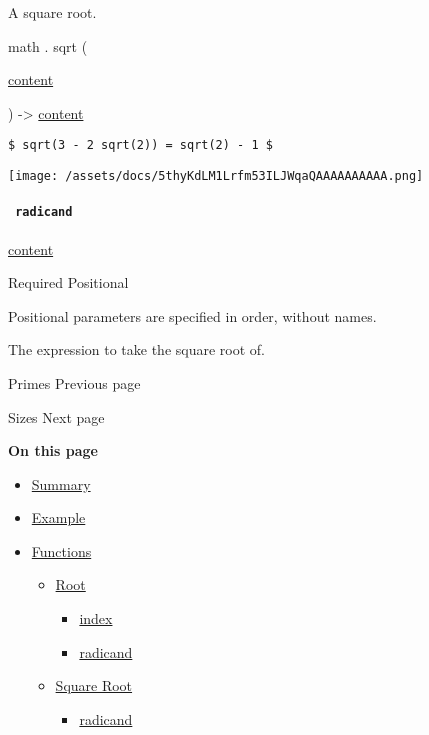 A square root.

math { . } { sqrt } (

{ \href{/docs/reference/foundations/content/}{content} }

) -\textgreater{} \href{/docs/reference/foundations/content/}{content}

\begin{verbatim}
$ sqrt(3 - 2 sqrt(2)) = sqrt(2) - 1 $
\end{verbatim}

\texttt{[image: /assets/docs/5thyKdLM1Lrfm53ILJWqaQAAAAAAAAAA.png]}

\paragraph{\texorpdfstring{\texttt{\ radicand\ }}{ radicand }}\label{functions-sqrt-radicand}

\href{/docs/reference/foundations/content/}{content}

{Required} {{ Positional }}

\label{functions-sqrt-radicand-positional-tooltip}
Positional parameters are specified in order, without names.

The expression to take the square root of.

\href{/docs/reference/math/primes/}{\pandocbounded{}}

{ Primes } { Previous page }

\href{/docs/reference/math/sizes/}{\pandocbounded{}}

{ Sizes } { Next page }

\textbf{On this page}

\begin{itemize}
\tightlist
\item
  \hyperref[summary]{Summary}
\item
  \hyperref[example]{Example}
\item
  \hyperref[functions]{Functions}

  \begin{itemize}
  \tightlist
  \item
    \hyperref[functions-root]{Root}

    \begin{itemize}
    \tightlist
    \item
      \hyperref[functions-root-index]{index}
    \item
      \hyperref[functions-root-radicand]{radicand}
    \end{itemize}
  \item
    \hyperref[functions-sqrt]{Square Root}

    \begin{itemize}
    \tightlist
    \item
      \hyperref[functions-sqrt-radicand]{radicand}
    \end{itemize}
  \end{itemize}
\end{itemize}

